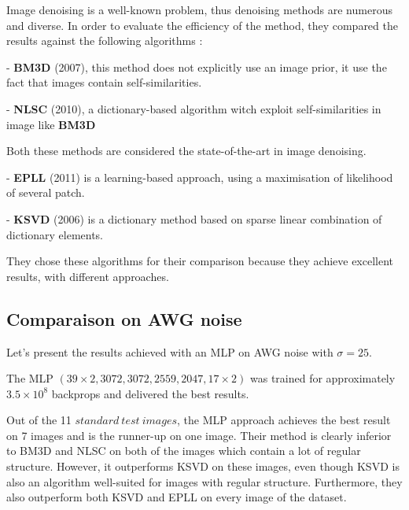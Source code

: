 \documentclass[10pt,a4paper]{article}
\newcommand{\svs}{\vspace{9pt}}
\begin{document}
Image denoising is a well-known problem, thus denoising methods are numerous and diverse. In order to evaluate the efficiency of the method, they compared the results against the following algorithms :

\svs
- \textbf{BM3D} (2007), this method does not explicitly use an image prior, it use the fact that images contain self-similarities.
\svs

- \textbf{NLSC} (2010), a dictionary-based algorithm witch exploit self-similarities in image like \textbf{BM3D}

\svs

Both these methods are considered the state-of-the-art in image denoising.

\svs

- \textbf{EPLL} (2011) is a learning-based approach, using a maximisation of likelihood of several patch.

\svs

- \textbf{KSVD} (2006) is a dictionary method based on sparse linear combination of dictionary elements.
\svs

They chose these algorithms for their comparison because they achieve excellent results, with different approaches.

\subsection{Comparaison on AWG noise}

Let's present the results achieved with an MLP on AWG noise with $\sigma=25$.

\svs 

The MLP $(39 \times 2, 3072, 3072, 2559, 2047, 17 \times 2)$ was trained for approximately $3.5 \times 10^8$ backprops and delivered the best results.

\svs 

Out of the 11 $standard\ test\ images$, the MLP approach achieves the best result on 7 images and is the runner-up on one image.
Their method is clearly inferior to BM3D and NLSC on both of the images which contain a lot of regular structure. However, it outperforms KSVD on these images, even though KSVD is also an algorithm well-suited for images with regular structure. Furthermore, they also outperform both KSVD and EPLL on every image of the dataset.
\end{document}
